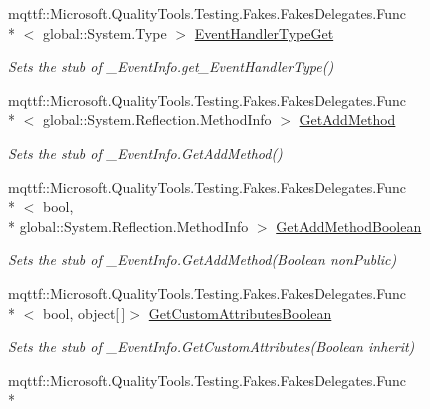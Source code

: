 \begin{DoxyCompactItemize}
mqttf\-::\-Microsoft.\-Quality\-Tools.\-Testing.\-Fakes.\-Fakes\-Delegates.\-Func\\*
$<$ global\-::\-System.\-Type $>$ \hyperlink{class_system_1_1_runtime_1_1_interop_services_1_1_fakes_1_1_stub___event_info_acf781527e8ef86795e6794af1403bc1f}{Event\-Handler\-Type\-Get}
\begin{DoxyCompactList}\small\item\em Sets the stub of \-\_\-\-Event\-Info.\-get\-\_\-\-Event\-Handler\-Type()\end{DoxyCompactList}\item 
mqttf\-::\-Microsoft.\-Quality\-Tools.\-Testing.\-Fakes.\-Fakes\-Delegates.\-Func\\*
$<$ global\-::\-System.\-Reflection.\-Method\-Info $>$ \hyperlink{class_system_1_1_runtime_1_1_interop_services_1_1_fakes_1_1_stub___event_info_a7749377a7d768677274ed1624628afe6}{Get\-Add\-Method}
\begin{DoxyCompactList}\small\item\em Sets the stub of \-\_\-\-Event\-Info.\-Get\-Add\-Method()\end{DoxyCompactList}\item 
mqttf\-::\-Microsoft.\-Quality\-Tools.\-Testing.\-Fakes.\-Fakes\-Delegates.\-Func\\*
$<$ bool, \\*
global\-::\-System.\-Reflection.\-Method\-Info $>$ \hyperlink{class_system_1_1_runtime_1_1_interop_services_1_1_fakes_1_1_stub___event_info_acff8ba0e740421d0a91298203c0d6999}{Get\-Add\-Method\-Boolean}
\begin{DoxyCompactList}\small\item\em Sets the stub of \-\_\-\-Event\-Info.\-Get\-Add\-Method(\-Boolean non\-Public)\end{DoxyCompactList}\item 
mqttf\-::\-Microsoft.\-Quality\-Tools.\-Testing.\-Fakes.\-Fakes\-Delegates.\-Func\\*
$<$ bool, object\mbox{[}$\,$\mbox{]}$>$ \hyperlink{class_system_1_1_runtime_1_1_interop_services_1_1_fakes_1_1_stub___event_info_a1194f80ae5deec55cadbb9596df583a8}{Get\-Custom\-Attributes\-Boolean}
\begin{DoxyCompactList}\small\item\em Sets the stub of \-\_\-\-Event\-Info.\-Get\-Custom\-Attributes(\-Boolean inherit)\end{DoxyCompactList}\item 
mqttf\-::\-Microsoft.\-Quality\-Tools.\-Testing.\-Fakes.\-Fakes\-Delegates.\-Func\\*

\end{DoxyCompactItemize}
